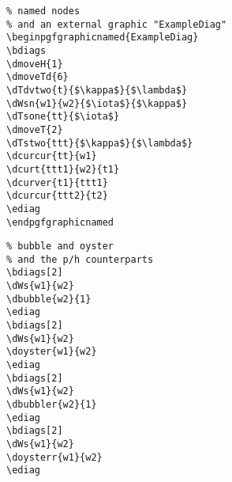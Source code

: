 \documentclass[a4paper]{article}
\begin{document}
\begin{minipage}[b]{0.5\linewidth}\centering
 \begin{lstlisting}
% named nodes 
% and an external graphic "ExampleDiag"
\beginpgfgraphicnamed{ExampleDiag}
\bdiags
\dmoveH{1}
\dmoveTd{6}
\dTdvtwo{t}{$\kappa$}{$\lambda$}
\dWsn{w1}{w2}{$\iota$}{$\kappa$}
\dTsone{tt}{$\iota$}
\dmoveT{2}
\dTstwo{ttt}{$\kappa$}{$\lambda$}
\dcurcur{tt}{w1}
\dcurt{ttt1}{w2}{t1}
\dcurver{t1}{ttt1}
\dcurcur{ttt2}{t2}
\ediag
\endpgfgraphicnamed
\end{lstlisting}
\end{minipage}
 \begin{minipage}[b]{0.5\linewidth}\centering
{}
\bdiags
{}
\ediag
\endpgfgraphicnamed
\end{minipage}


\begin{minipage}[b]{0.5\linewidth}\centering
 \begin{lstlisting}
% bubble and oyster
% and the p/h counterparts 
\bdiags[2]
\dWs{w1}{w2}
\dbubble{w2}{1}
\ediag
\bdiags[2]
\dWs{w1}{w2}
\doyster{w1}{w2}
\ediag
\bdiags[2]
\dWs{w1}{w2}
\dbubbler{w2}{1}
\ediag
\bdiags[2]
\dWs{w1}{w2}
\doysterr{w1}{w2}
\ediag
\end{lstlisting}
\end{minipage}
 \begin{minipage}[b]{0.5\linewidth}\centering
\bdiags[2]
\ediag
\bdiags[2]
\ediag
\bdiags[2]
\ediag
\bdiags[2]
\ediag
\end{minipage}
\end{document}
